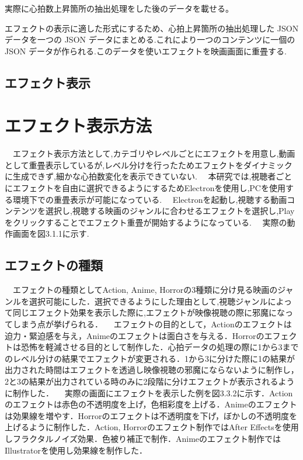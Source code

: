 実際に心拍数上昇箇所の抽出処理をした後のデータを載せる。

エフェクトの表示に適した形式にするため、心拍上昇箇所の抽出処理した JSON データを一つの JSON データにまとめる.これにより一つのコンテンツに一個の JSON データが作られる.このデータを使いエフェクトを映画画面に重畳する.

\subsection{エフェクト表示}

\section{エフェクト表示方法}
　エフェクト表示方法として,カテゴリやレベルごとにエフェクトを用意し,動画として重畳表示しているが,レベル分けを行ったためエフェクトをダイナミックに生成できず,細かな心拍数変化を表示できていない.
　本研究では,視聴者ごとにエフェクトを自由に選択できるようにするためElectronを使用し,PCを使用する環境下での重畳表示が可能になっている.
　Electronを起動し,視聴する動画コンテンツを選択し,視聴する映画のジャンルに合わせるエフェクトを選択し,Playをクリックすることでエフェクト重畳が開始するようになっている.
　実際の動作画面を図3.1.1に示す.


\subsection{エフェクトの種類}
　エフェクトの種類としてAction, Anime, Horrorの3種類に分け見る映画のジャンルを選択可能にした．選択できるようにした理由として,視聴ジャンルによって同じエフェクト効果を表示した際に,エフェクトが映像視聴の際に邪魔になってしまう点が挙げられる．
　エフェクトの目的として，Actionのエフェクトは迫力・緊迫感を与え，Animeのエフェクトは面白さを与える．Horrorのエフェクトは恐怖を軽減させる目的として制作した．心拍データの処理の際に1から3までのレベル分けの結果でエフェクトが変更される．1から3に分けた際に1の結果が出力された時間はエフェクトを透過し映像視聴の邪魔にならないように制作し，2と3の結果が出力されている時のみに2段階に分けエフェクトが表示されるように制作した．
　実際の画面にエフェクトを表示した例を図3.3.2に示す．Actionのエフェクトは赤色の不透明度を上げ，色相彩度を上げる．Animeのエフェクトは効果線を増やす．Horrorのエフェクトは不透明度を下げ，ぼかしの不透明度を上げるように制作した．Action, Horrorのエフェクト制作ではAfter Effectsを使用しフラクタルノイズ効果．色被り補正で制作．Animeのエフェクト制作ではIllustratorを使用し効果線を制作した．

